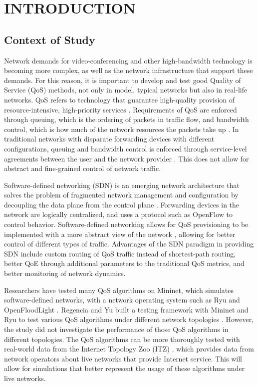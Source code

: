 \chapter{INTRODUCTION}

\section{Context of Study}

Network demands for video-conferencing and other high-bandwidth technology is becoming more complex, as well as the network infrastructure that support these demands. For this reason, it is important to develop and test good Quality of Service (QoS) methods, not only in model, typical networks but also in real-life networks. QoS refers to technology that guarantee high-quality provision of resource-intensive, high-priority services \cite{noauthor_what_nodate}. Requirements of QoS are enforced through queuing, which is the ordering of packets in traffic flow, and bandwidth control, which is how much of the network resources the packets take up \cite{zhao_internet_2000}. In traditional networks with disparate forwarding devices with different configurations, queuing and bandwidth control is enforced through service-level agreements between the user and the network provider \cite{karakus_quality_2017}. This does not allow for abstract and fine-grained control of network traffic.

Software-defined networking (SDN) is an emerging network architecture that solves the problem of fragmented network management and configuration by decoupling the data plane from the control plane \cite{kreutz_software-defined_2015}. Forwarding devices in the network are logically centralized, and uses a protocol such as OpenFlow to control behavior. Software-defined networking allows for QoS provisioning to be implemented with a more abstract view of the network , allowing for better control of different types of traffic. Advantages of the SDN paradigm in providing SDN include custom routing of QoS traffic instead of shortest-path routing, better QoE through additional parameters to the traditional QoS metrics, and better monitoring of network dynamics.

Researchers have tested many QoS algorithms on Mininet, which simulates software-defined networks, with a network operating system such as Ryu and OpenFloodLight \cite{karakus_quality_2017}. Regencia and Yu built a testing framework with Mininet and Ryu to test various QoS algorithms under different network topologies \cite{yang_introducing_2022}. However, the study did not investigate the performance of those QoS algorithms in different topologies. The QoS algorithms can be more thoroughly tested with real-world data from the Internet Topology Zoo (ITZ) \cite{knight_internet_2011}, which provides data from network operators about live networks that provide Internet service. This will allow for simulations that better represent the usage of these algorithms under live networks.

